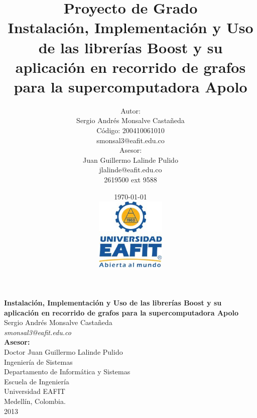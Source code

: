 \documentclass[twoside,letterpaper,12pt]{report}
\title{
	Proyecto de Grado\\[0.5cm]
	Instalación, Implementación y Uso de las librerías Boost y su aplicación en recorrido de grafos para la supercomputadora Apolo
}
\author{
	Autor:\\[0.3cm]
	Sergio Andrés Monsalve Castañeda\\
	Código: 200410061010\\
	smonsal3@eafit.edu.co\\[0.7cm]
	Asesor: \\[0.3cm]
	Juan Guillermo Lalinde Pulido\\
	jlalinde@eafit.edu.co\\
	2619500 ext 9588%
}
\date{
	\today \\[0.5cm]
	\includegraphics[width=0.25\textwidth]{aux/logo_eafit} 
}
\begin{document}

\maketitle


\thispagestyle{empty} %
\begin{center}
\textbf{{\Large Instalación, Implementación y Uso de las librerías Boost y su aplicación en recorrido de grafos para la supercomputadora Apolo}}\\[3cm]
{\Large Sergio Andrés Monsalve Castañeda} \\ {\large \textit{smonsal3@eafit.edu.co}}\\[2.5cm]

{\large \textbf{Asesor:} \\ Doctor Juan Guillermo Lalinde Pulido}\\[3cm]

Ingeniería de Sistemas \\ Departamento de Informática y Sistemas  \\ Escuela de Ingeniería \\ Universidad EAFIT \\ Medellín, Colombia.\\
2013

\end{center}
\pagebreak

\end{document}
